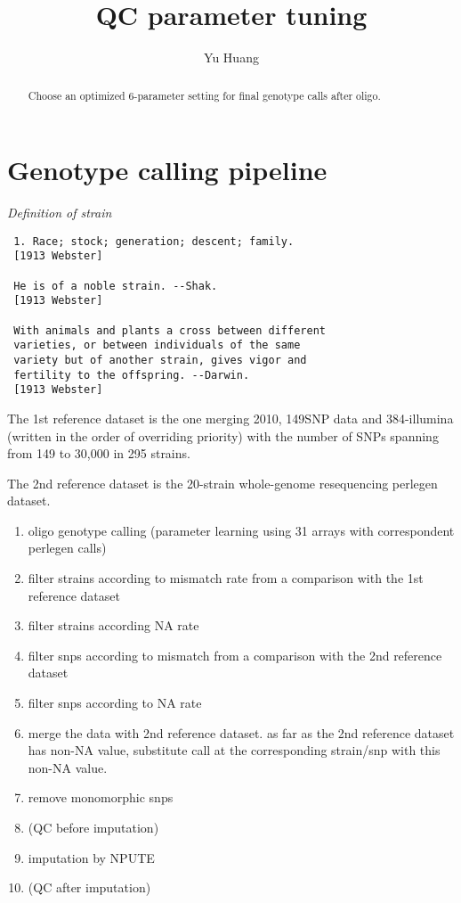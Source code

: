 \documentclass[a4paper,10pt]{article}
\title{QC parameter tuning}
\author{Yu Huang}
\begin{document}
\maketitle

\begin{abstract}
Choose an optimized 6-parameter setting for final genotype calls after oligo.

\end{abstract}

\section{Genotype calling pipeline}
\emph{Definition of strain}
\begin{verbatim}
 1. Race; stock; generation; descent; family.
 [1913 Webster]

 He is of a noble strain. --Shak.
 [1913 Webster]

 With animals and plants a cross between different
 varieties, or between individuals of the same
 variety but of another strain, gives vigor and
 fertility to the offspring. --Darwin.
 [1913 Webster]
\end{verbatim}

The 1st reference dataset is the one merging 2010, 149SNP data and 384-illumina (written in the order of overriding priority) with the number of SNPs spanning from 149 to 30,000 in 295 strains.

The 2nd reference dataset is the 20-strain whole-genome resequencing perlegen dataset.

\begin{enumerate}
 \item oligo genotype calling (parameter learning using 31 arrays with correspondent perlegen calls)
 \item filter strains according to mismatch rate from a comparison with the 1st reference dataset
 \item filter strains according NA rate
 \item filter snps according to mismatch from a comparison with the 2nd reference dataset
 \item filter snps according to NA rate
 \item merge the data with 2nd reference dataset. as far as the 2nd reference dataset has non-NA value,  substitute call at the corresponding strain/snp with this non-NA value.
 \item remove monomorphic snps
 \item (QC before imputation)
 \item imputation by NPUTE
 \item (QC after imputation)
\end{enumerate}
\end{document}
